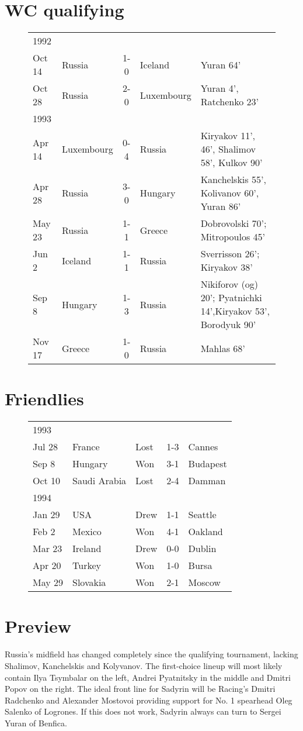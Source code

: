 \section{WC qualifying}
\begin{figure}[H]
\small
\begin{tabular}{l l c l l}
1992 & & & & \\
Oct 14 & Russia & 1-0 & Iceland & Yuran 64' \\
Oct 28 & Russia & 2-0 & Luxembourg & Yuran 4', Ratchenko 23' \\
1993 & & & & \\
Apr 14 & Luxembourg & 0-4 & Russia & Kiryakov 11', 46', Shalimov 58', Kulkov 90' \\
Apr 28 & Russia & 3-0 & Hungary & Kanchelskis 55', Kolivanov 60', Yuran 86' \\
May 23 & Russia & 1-1 & Greece & Dobrovolski 70'; Mitropoulos 45' \\
Jun 2 & Iceland & 1-1 & Russia & Sverrisson 26'; Kiryakov 38' \\
Sep 8 & Hungary & 1-3 & Russia & Nikiforov (og) 20'; Pyatnichki 14',Kiryakov 53', Borodyuk 90' \\
Nov 17 & Greece & 1-0 & Russia & Mahlas 68' \\
\end{tabular}
\normalsize
\end{figure}
\section{Friendlies}
\begin{figure}[H]
\begin{tabular}{l l l c l}
1993 & & & & \\
Jul 28 & France & Lost & 1-3 & Cannes \\
Sep 8 & Hungary & Won & 3-1 & Budapest \\
Oct 10 & Saudi Arabia & Lost & 2-4 & Damman \\
1994 & & & & \\
Jan 29 & USA & Drew & 1-1 & Seattle \\
Feb 2 & Mexico & Won & 4-1 & Oakland \\
Mar 23 & Ireland & Drew & 0-0 & Dublin \\
Apr 20 & Turkey & Won & 1-0 & Bursa \\
May 29 & Slovakia & Won & 2-1 & Moscow \\
\end{tabular}
\end{figure}
\section{Preview}
Russia's midfield has changed completely since the qualifying tournament,
lacking Shalimov, Kanchelskis and Kolyvanov. The first-choice lineup will most 
likely contain Ilya Tsymbalar on the left, Andrei Pyatnitsky in the middle and 
Dmitri Popov on the right. The ideal front line for Sadyrin will be Racing's 
Dmitri Radchenko and Alexander Mostovoi providing support for No. 1 spearhead 
Oleg Salenko of Logrones. If this does not work, Sadyrin always can turn to 
Sergei Yuran of Benfica.

